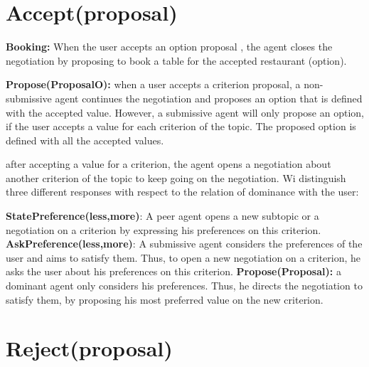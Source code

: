 \documentclass{llncs}
\begin{document}
\section{Accept(proposal)}

\item \textbf{Booking: } When the user accepts an option proposal , the agent closes the negotiation by proposing to book a table for the accepted restaurant (option).

\item \textbf{Propose(ProposalO):} when a user accepts a criterion proposal, a non-submissive agent continues the negotiation and proposes an option that is defined with the accepted value. However, a submissive agent will only propose an option, if the user accepts a value for each criterion of the topic.  The proposed option is defined with all the accepted values.
\item after accepting a value for a criterion, the agent opens a negotiation about another criterion of the topic to keep going on the negotiation. Wi distinguish three different responses with respect to the relation of dominance with the user:

	\subitem \textbf{StatePreference(less,more)}:  A peer agent opens a new subtopic or a negotiation on a criterion by expressing his preferences on this criterion.
	\subitem \textbf{AskPreference(less,more)}:  A submissive agent considers the preferences of the user and aims to satisfy them. Thus, to open a new negotiation on a criterion, he asks the user about his preferences on this criterion.
	\subitem \textbf{Propose(Proposal):} a dominant agent only considers his preferences. Thus, he directs the negotiation to satisfy them, by proposing his most preferred value on the new criterion. 

\section{Reject(proposal)}
\end{document}
